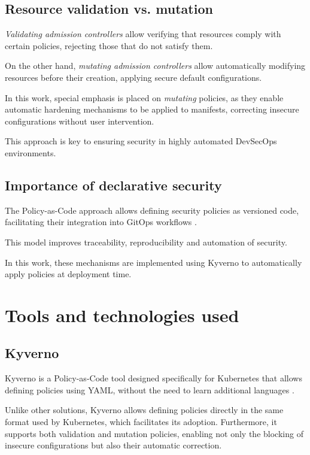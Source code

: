 \subsection{Resource validation vs. mutation}

\textit{Validating admission controllers} allow verifying that resources comply with certain policies, rejecting those that do not satisfy them.

On the other hand, \textit{mutating admission controllers} allow automatically modifying resources before their creation, applying secure default configurations.

In this work, special emphasis is placed on \textit{mutating} policies, as they enable automatic hardening mechanisms to be applied to manifests, correcting insecure configurations without user intervention.

This approach is key to ensuring security in highly automated DevSecOps environments.

\subsection{Importance of declarative security}

The Policy-as-Code approach allows defining security policies as versioned code, facilitating their integration into GitOps workflows \cite{huttermann2022devops}.

This model improves traceability, reproducibility and automation of security.

In this work, these mechanisms are implemented using Kyverno to automatically apply policies at deployment time.

\section{Tools and technologies used}

\subsection{Kyverno}

Kyverno is a Policy-as-Code tool designed specifically for Kubernetes that allows defining policies using YAML, without the need to learn additional languages \cite{kyverno_docs}.

Unlike other solutions, Kyverno allows defining policies directly in the same format used by Kubernetes, which facilitates its adoption. Furthermore, it supports both validation and mutation policies, enabling not only the blocking of insecure configurations but also their automatic correction.

